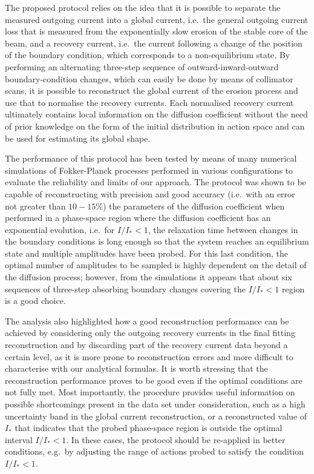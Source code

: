 {The proposed protocol relies on the idea that it is possible to separate the measured outgoing current into a global current, i.e.\ the general outgoing current loss that is measured from the exponentially slow erosion of the stable core of the beam, and a recovery current, i.e.\ the current following a change of the position of the boundary condition, which corresponds to a non-equilibrium state. By performing an alternating three-step sequence of outward-inward-outward boundary-condition changes, which can easily be done by means of collimator scans, it is possible to reconstruct the global current of the erosion process and use that to normalise the recovery currents. Each normalised recovery current ultimately contains local information on the diffusion coefficient without the need of prior knowledge on the form of the initial distribution in action space and can be used for estimating its global shape.

The performance of this protocol has been tested by means of many numerical simulations of Fokker-Planck processes performed in various configurations to evaluate the reliability and limits of our approach. The protocol was shown to be capable of reconstructing with precision and good accuracy  {(i.e.\ with an error not greater than $10-15\%$)} the parameters of the diffusion coefficient when performed in a phase-space region where the diffusion coefficient has an exponential evolution, i.e.\ for $I/I_\ast < 1$, the relaxation time between changes in the boundary conditions is long enough so that the system reaches an equilibrium state and multiple amplitudes have been probed. For this last condition, the optimal number of amplitudes to be sampled is highly dependent on the detail of the diffusion process; however, from the simulations it appears that about six sequences of three-step absorbing boundary changes covering the $I / I_\ast < 1$ region is a good choice. 

The analysis also highlighted how a good reconstruction performance can be achieved by considering only the outgoing recovery currents in the final fitting reconstruction and by discarding part of the recovery current data beyond a certain level, as it is more prone to reconstruction errors and more difficult to characterise with our analytical formulas. It is worth stressing that the reconstruction performance proves to be good even if the optimal conditions are not fully met. Most importantly, the procedure provides useful information on possible shortcomings present in the data set under consideration, such as a high uncertainty band in the global current reconstruction, or a reconstructed value of $I_\ast$ that indicates that the probed phase-space region is outside the optimal interval $I / I_\ast < 1$. In these cases, the protocol should be re-applied in better conditions, e.g.\ by adjusting the range of actions probed to satisfy the condition $I / I_\ast < 1$.

}

